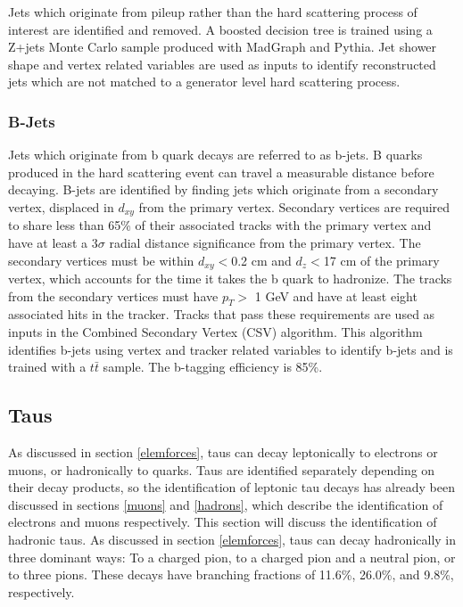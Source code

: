 \documentclass[oneside, letterpaper, oldfontcommands]{memoir}
\begin{document}
\qquad Jets which originate from pileup rather than the hard scattering process of interest are identified and removed. A boosted decision tree is trained using a Z+jets Monte Carlo sample produced with {\sc MadGraph} and {\sc Pythia}. Jet shower shape and vertex related variables are used as inputs to identify reconstructed jets which are not matched to a generator level hard scattering process. \cite{CMS-PAS-JME-13-005} 

\subsubsection{B-Jets}\label{bjets}
\qquad Jets which originate from b quark decays are referred to as b-jets. B quarks produced in the hard scattering event can travel a measurable distance before decaying. B-jets are identified by finding jets which originate from a secondary vertex, displaced in $d_{xy}$ from the primary vertex. Secondary vertices are required to share less than 65\% of their associated tracks with the primary vertex and have at least a 3$\sigma$ radial distance significance from the primary vertex. The secondary vertices must be within $d_{xy} <$0.2 cm and $d_{z} <$17 cm of the primary vertex, which accounts for the time it takes the b quark to hadronize. The tracks from the secondary vertices must have $p_{T} >$ 1 GeV and have at least eight associated hits in the tracker. Tracks that pass these requirements are used as inputs in the Combined Secondary Vertex (CSV) algorithm. This algorithm identifies b-jets using vertex and tracker related variables to identify b-jets and is trained with a $t\bar{t}$ sample. The b-tagging efficiency is 85\%. \cite{Chatrchyan:2012jua}

\subsection{Taus}\label{taus}

\qquad As discussed in section \ref{elemforces}, taus can decay leptonically to electrons or muons, or hadronically to quarks. Taus are identified separately depending on their decay products, so the identification of leptonic tau decays has already been discussed in sections \ref{muons} and \ref{hadrons}, which describe the identification of electrons and muons respectively. This section will discuss the identification of hadronic taus. As discussed in section \ref{elemforces}, taus can decay hadronically in three dominant ways: To a charged pion, to a charged pion and a neutral pion, or to three pions. These decays have branching fractions of 11.6\%, 26.0\%, and 9.8\%, respectively.
\end{document}
